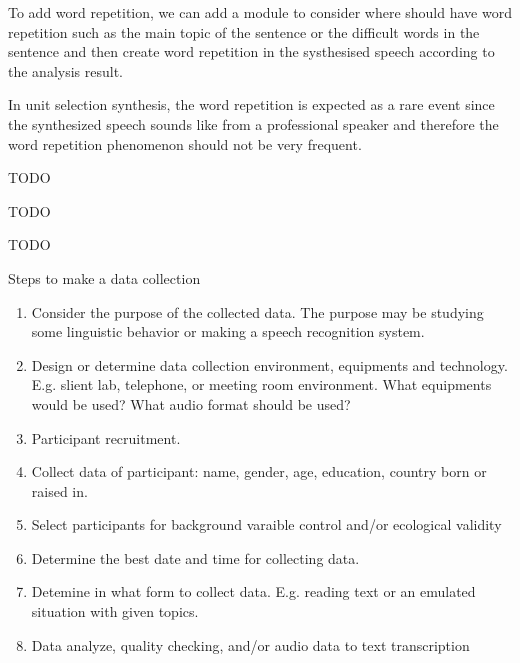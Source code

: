 \documentclass[12pt]{article}
\newenvironment{problem}[2][Problem]{\begin{trivlist}
\item[\hskip \labelsep {\bfseries #1}\hskip \labelsep {\bfseries #2.}]}{\end{trivlist}}
\begin{document}
\begin{problem}{2.2}
    To add word repetition, we can add a module to consider where should have
    word repetition such as the main topic of the sentence or the difficult words
    in the sentence and then create word repetition in the systhesised speech according
    to the analysis result.

    In unit selection synthesis, the word repetition is expected as a rare event
    since the synthesized speech sounds like from a professional speaker and therefore
    the word repetition phenomenon should not be very frequent.
\end{problem}

\begin{problem}{2.3}
    TODO
\end{problem}

\begin{problem}{3.1}
    TODO
\end{problem}

\begin{problem}{3.2}
    TODO
\end{problem}

\begin{problem}{4.1}
    Steps to make a data collection
    \begin{enumerate}
        \item Consider the purpose of the collected data. The purpose may be
        studying some linguistic behavior or making a speech recognition system.
        \item Design or determine data collection environment, equipments and technology.
        E.g. slient lab, telephone, or meeting room environment.
        What equipments would be used? What audio format should be used?
        \item Participant recruitment.
        \item Collect data of participant: name, gender, age, education, country born or raised in.
        \item Select participants for background varaible control and/or ecological validity
        \item Determine the best date and time for collecting data.
        \item Detemine in what form to collect data.
        E.g. reading text or an emulated situation with given topics.
        \item Data analyze, quality checking, and/or audio data to text transcription
    \end{enumerate}
\end{problem}
\end{document}
